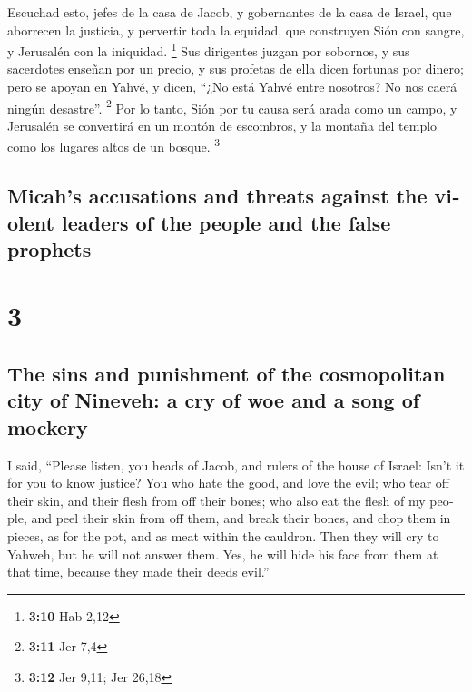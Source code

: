 \begin{paracol}{2}
 Escuchad esto, jefes de la casa de Jacob, y gobernantes
de la casa de Israel, que aborrecen la justicia, y pervertir toda la
equidad,  que construyen Sión con sangre, y Jerusalén con
la iniquidad. \footnote{\textbf{3:10} Hab 2,12}  Sus
dirigentes juzgan por sobornos, y sus sacerdotes enseñan por un precio,
y sus profetas de ella dicen fortunas por dinero; pero se apoyan en
Yahvé, y dicen, ``¿No está Yahvé entre nosotros? No nos caerá ningún
desastre''. \footnote{\textbf{3:11} Jer 7,4}  Por lo
tanto, Sión por tu causa será arada como un campo, y Jerusalén se
convertirá en un montón de escombros, y la montaña del templo como los
lugares altos de un bosque. \footnote{\textbf{3:12} Jer 9,11; Jer 26,18}

\switchcolumn
\begin{otherlanguage}{english}

\hypertarget{micahs-accusations-and-threats-against-the-violent-leaders-of-the-people-and-the-false-prophets}{%
\subsection{Micah's accusations and threats against the violent leaders
of the people and the false
prophets}\label{micahs-accusations-and-threats-against-the-violent-leaders-of-the-people-and-the-false-prophets}}

\hypertarget{section-5}{%
\section{3}\label{section-5}}

\hypertarget{the-sins-and-punishment-of-the-cosmopolitan-city-of-nineveh-a-cry-of-woe-and-a-song-of-mockery}{%
\subsection{The sins and punishment of the cosmopolitan city of Nineveh:
a cry of woe and a song of
mockery}\label{the-sins-and-punishment-of-the-cosmopolitan-city-of-nineveh-a-cry-of-woe-and-a-song-of-mockery}}

 I said, ``Please listen, you heads of Jacob, and rulers
of the house of Israel: Isn't it for you to know justice? 
You who hate the good, and love the evil; who tear off their skin, and
their flesh from off their bones;  who also eat the flesh
of my people, and peel their skin from off them, and break their bones,
and chop them in pieces, as for the pot, and as meat within the
cauldron.  Then they will cry to Yahweh, but he will not
answer them. Yes, he will hide his face from them at that time, because
they made their deeds evil.''


\end{otherlanguage}
\end{paracol}

